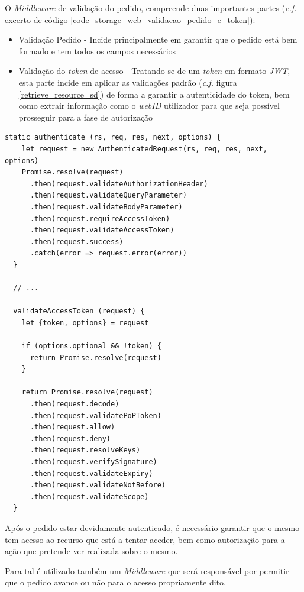 O \emph{Middleware} de validação do pedido, compreende duas importantes partes (\emph{c.f.} excerto de código \ref{code_storage_web_validacao_pedido_e_token}):
\begin{itemize}
    \item Validação Pedido - Incide principalmente em garantir que o pedido está bem formado e tem todos os campos necessários
    \item Validação do \emph{token} de acesso - Tratando-se de um \emph{token} em formato \emph{\acrshort{JWT}}, esta parte incide em aplicar as validações padrão (\emph{c.f.} figura \ref{retrieve_resource_sd}) de forma a garantir a autenticidade do token, bem como extrair informação como o \emph{webID} utilizador para que seja possível prosseguir para a fase de autorização
\end{itemize}

\begin{lstlisting}[caption={Camada de validação do pedido e do token de acesso na biblioteca \emph{oidc-rs}}, label={code_storage_web_validacao_pedido_e_token}]
  static authenticate (rs, req, res, next, options) {
    let request = new AuthenticatedRequest(rs, req, res, next, options)
    Promise.resolve(request)
      .then(request.validateAuthorizationHeader)
      .then(request.validateQueryParameter)
      .then(request.validateBodyParameter)
      .then(request.requireAccessToken)
      .then(request.validateAccessToken)
      .then(request.success)
      .catch(error => request.error(error))
  }
  
  // ...

  validateAccessToken (request) {
    let {token, options} = request

    if (options.optional && !token) {
      return Promise.resolve(request)
    }

    return Promise.resolve(request)
      .then(request.decode)
      .then(request.validatePoPToken)
      .then(request.allow)
      .then(request.deny)
      .then(request.resolveKeys)
      .then(request.verifySignature)
      .then(request.validateExpiry)
      .then(request.validateNotBefore)
      .then(request.validateScope)
  }

\end{lstlisting}

Após o pedido estar devidamente autenticado, é necessário garantir que o mesmo tem acesso ao recurso que está a tentar aceder, bem como autorização para a ação que pretende ver realizada sobre o mesmo. 

Para tal é utilizado também um \emph{Middleware} que será responsável por permitir que o pedido avance ou não para o acesso propriamente dito.

